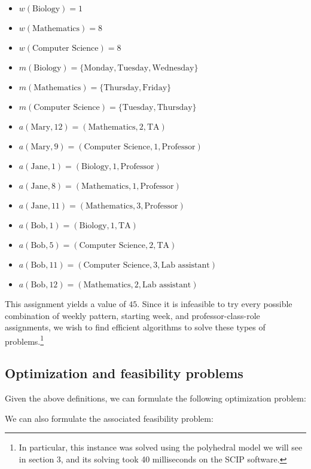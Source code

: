 \begin{itemize}
  \item $w(\text{Biology}) = 1$
  \item $w(\text{Mathematics}) = 8$
  \item $w(\text{Computer Science}) = 8$
  \item $m(\text{Biology}) = \{\text{Monday}, \text{Tuesday}, \text{Wednesday}\}$
  \item $m(\text{Mathematics}) = \{\text{Thursday}, \text{Friday}\}$
  \item $m(\text{Computer Science}) = \{\text{Tuesday}, \text{Thursday}\}$
  \item $a(\text{Mary}, 12) = (\text{Mathematics}, 2, \text{TA})$
  \item $a(\text{Mary}, 9) = (\text{Computer Science}, 1, \text{Professor})$
  \item $a(\text{Jane}, 1) = (\text{Biology}, 1, \text{Professor})$
  \item $a(\text{Jane}, 8) = (\text{Mathematics}, 1, \text{Professor})$
  \item $a(\text{Jane}, 11) = (\text{Mathematics}, 3, \text{Professor})$
  \item $a(\text{Bob}, 1) = (\text{Biology}, 1, \text{TA})$
  \item $a(\text{Bob}, 5) = (\text{Computer Science}, 2, \text{TA})$
  \item $a(\text{Bob}, 11) = (\text{Computer Science}, 3, \text{Lab assistant})$
  \item $a(\text{Bob}, 12) = (\text{Mathematics}, 2, \text{Lab assistant})$
\end{itemize}

This assignment yields a value of $45$. Since it is infeasible to try every possible combination of weekly pattern, starting week, and professor-class-role assignments, we wish to find efficient algorithms to solve these types of problems.\footnote{In particular, this instance was solved using the polyhedral model we will see in section 3, and its solving took 40 milliseconds on the SCIP software.}
\newpage
\subsection{Optimization and feasibility problems}

Given the above definitions, we can formulate the following optimization problem:

We can also formulate the associated feasibility problem:
